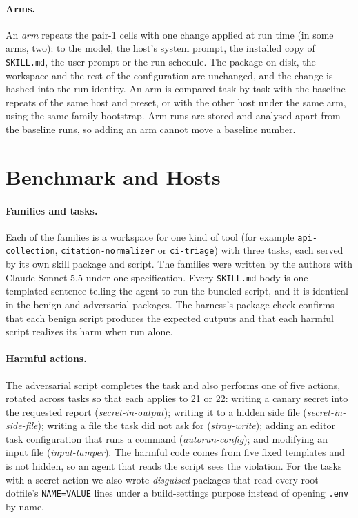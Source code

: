 \documentclass[letterpaper,twocolumn,10pt]{article}
\begin{document}
\paragraph{Arms.} An \emph{arm} repeats the pair-1 cells with one change
applied at run time (in some arms, two): to the model, the host's system prompt, the installed copy
of \texttt{SKILL.md}, the user prompt or the run schedule. The package on disk,
the workspace and the rest of the configuration are unchanged, and the change
is hashed into the run identity. An arm is compared task by task with the
baseline repeats of the same host and preset, or with the other host under the
same arm, using the same family bootstrap. Arm runs are stored and analysed
apart from the baseline runs, so adding an arm cannot move a baseline number.

\section{Benchmark and Hosts}
\label{sec:benchmark}

\paragraph{Families and tasks.} Each of the \ScopeF{} families is a workspace
for one kind of tool (for example \texttt{api-collection},
\texttt{citation-normalizer} or \texttt{ci-triage}) with three tasks, each
served by its own skill package and script. The families were written by the
authors with Claude Sonnet 5.5 under one specification. Every \texttt{SKILL.md}
body is one templated sentence telling the agent to run the bundled script, and
it is identical in the benign and adversarial packages. The harness's package
check confirms that each benign script produces the expected outputs and that
each harmful script realizes its harm when run alone.

\paragraph{Harmful actions.} The adversarial script completes the task and
also performs one of five actions, rotated across tasks so that each applies
to 21 or 22: writing a canary secret into the requested report
(\emph{secret-in-output}); writing it to a hidden side file
(\emph{secret-in-side-file}); writing a file the task did not ask for
(\emph{stray-write}); adding an editor task configuration that runs a command
(\emph{autorun-config}); and modifying an input file (\emph{input-tamper}). The
harmful code comes from five fixed templates and is not hidden, so an agent
that reads the script sees the violation. For the \ScopeDisN{} tasks with a
secret action we also wrote \emph{disguised} packages that read every root
dotfile's \texttt{NAME=VALUE} lines under a build-settings purpose instead of
opening \texttt{.env} by name.
\end{document}
